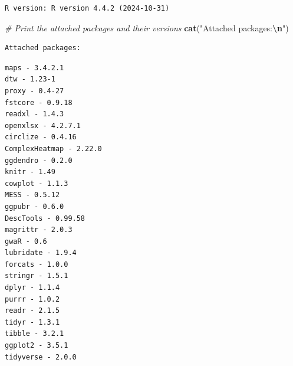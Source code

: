 \documentclass[
  11pt,
]{article}
\newenvironment{Shaded}{\begin{snugshade}}{\end{snugshade}}
\newcommand{\CommentTok}[1]{\textcolor[rgb]{0.56,0.35,0.01}{\textit{#1}}}
\newcommand{\ControlFlowTok}[1]{\textcolor[rgb]{0.13,0.29,0.53}{\textbf{#1}}}
\newcommand{\FunctionTok}[1]{\textcolor[rgb]{0.13,0.29,0.53}{\textbf{#1}}}
\newcommand{\NormalTok}[1]{#1}
\newcommand{\SpecialCharTok}[1]{\textcolor[rgb]{0.81,0.36,0.00}{\textbf{#1}}}
\newcommand{\StringTok}[1]{\textcolor[rgb]{0.31,0.60,0.02}{#1}}
\begin{document}
\begin{verbatim}
R version: R version 4.4.2 (2024-10-31) 
\end{verbatim}

\begin{Shaded}
\begin{Highlighting}[]
\CommentTok{\# Print the attached packages and their versions}
\FunctionTok{cat}\NormalTok{(}\StringTok{"Attached packages:}\SpecialCharTok{\textbackslash{}n}\StringTok{"}\NormalTok{)}
\end{Highlighting}
\end{Shaded}

\begin{verbatim}
Attached packages:
\end{verbatim}

\begin{Shaded}
\end{Shaded}

\begin{verbatim}
maps - 3.4.2.1 
dtw - 1.23-1 
proxy - 0.4-27 
fstcore - 0.9.18 
readxl - 1.4.3 
openxlsx - 4.2.7.1 
circlize - 0.4.16 
ComplexHeatmap - 2.22.0 
ggdendro - 0.2.0 
knitr - 1.49 
cowplot - 1.1.3 
MESS - 0.5.12 
ggpubr - 0.6.0 
DescTools - 0.99.58 
magrittr - 2.0.3 
gwaR - 0.6 
lubridate - 1.9.4 
forcats - 1.0.0 
stringr - 1.5.1 
dplyr - 1.1.4 
purrr - 1.0.2 
readr - 2.1.5 
tidyr - 1.3.1 
tibble - 3.2.1 
ggplot2 - 3.5.1 
tidyverse - 2.0.0 
\end{verbatim}
\end{document}
